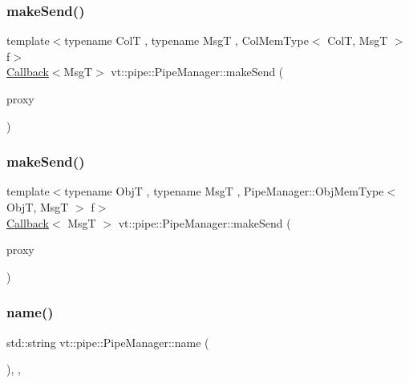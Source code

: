 \subsubsection{\texorpdfstring{make\+Send()}{makeSend()}\hspace{0.1cm}{\footnotesize\ttfamily [5/6]}}
{\footnotesize\ttfamily template$<$typename ColT , typename MsgT , Col\+Mem\+Type$<$ Col\+T, Msg\+T $>$ f$>$ \\
\hyperlink{namespacevt_a36db99df4c973d48b1118a293fff533f}{Callback}$<$MsgT$>$ vt\+::pipe\+::\+Pipe\+Manager\+::make\+Send (\begin{DoxyParamCaption}\item[{typename Col\+T\+::\+Proxy\+Type}]{proxy }\end{DoxyParamCaption})}

\mbox{\label{structvt_1_1pipe_1_1_pipe_manager_aa5d48a3b64820bec240a6a61bdfb4524}} 
\subsubsection{\texorpdfstring{make\+Send()}{makeSend()}\hspace{0.1cm}{\footnotesize\ttfamily [6/6]}}
{\footnotesize\ttfamily template$<$typename ObjT , typename MsgT , Pipe\+Manager\+::\+Obj\+Mem\+Type$<$ Obj\+T, Msg\+T $>$ f$>$ \\
\hyperlink{namespacevt_a36db99df4c973d48b1118a293fff533f}{Callback}$<$ MsgT $>$ vt\+::pipe\+::\+Pipe\+Manager\+::make\+Send (\begin{DoxyParamCaption}\item[{\hyperlink{structvt_1_1objgroup_1_1proxy_1_1_proxy_elm}{objgroup\+::proxy\+::\+Proxy\+Elm}$<$ ObjT $>$}]{proxy }\end{DoxyParamCaption})}

\mbox{\label{structvt_1_1pipe_1_1_pipe_manager_aad60c922d604dd1b9ff47e428d265eed}} 
\subsubsection{\texorpdfstring{name()}{name()}}
{\footnotesize\ttfamily std\+::string vt\+::pipe\+::\+Pipe\+Manager\+::name (\begin{DoxyParamCaption}{ }\end{DoxyParamCaption})\hspace{0.3cm}{\ttfamily [inline]}, {\ttfamily [override]}, {\ttfamily [virtual]}}



